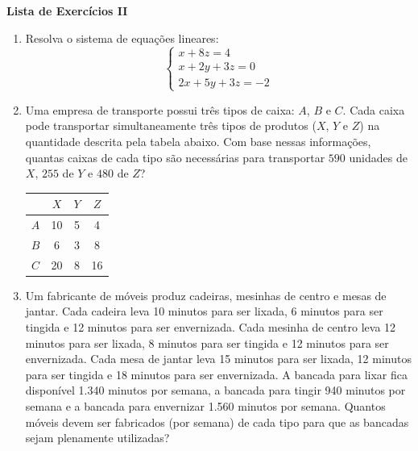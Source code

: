 \documentclass[12pt,a4paper]{article}
\begin{document}
\begin{center}
  \textbf{Lista de Exercícios II}
\end{center}

\begin{enumerate}
  \item Resolva o sistema de equações lineares:
    $$\begin{cases}
      x +  8 z  =  4\\
      x  +  2y  +  3z  =  0\\
      2x  +  5y  +  3z  =  -2
    \end{cases}$$

  \item Uma empresa de transporte possui três tipos de caixa: $A$, $B$ e
    $C$. Cada caixa pode transportar simultaneamente três tipos de produtos
    ($X$, $Y$ e $Z$) na quantidade descrita pela tabela abaixo. Com
    base nessas informações, quantas caixas de cada tipo são necessárias
    para transportar $590$ unidades de $X$, $255$ de $Y$ e $480$
    de $Z$?
    
    \begin{table}[H]
      \centering
      \begin{tabular}{|c|c|c|c|}
        \cline{2-4} 
        \multicolumn{1}{c|}{} & $X$ & $Y$ & $Z$\\
        \hline 
        $A$ & 10 & 5 & 4\\
        \hline 
        $B$ & 6 & 3 & 8\\
        \hline 
        $C$ & 20 & 8 & 16\\
        \hline 
      \end{tabular}
    \end{table}

  \item Um fabricante de móveis produz cadeiras, mesinhas de centro e mesas
    de jantar. Cada cadeira leva 10 minutos para ser lixada, 6 minutos
    para ser tingida e 12 minutos para ser envernizada. Cada mesinha de
    centro leva 12 minutos para ser lixada, 8 minutos para ser tingida
    e 12 minutos para ser envernizada. Cada mesa de jantar leva 15 minutos
    para ser lixada, 12 minutos para ser tingida e 18 minutos para ser
    envernizada. A bancada para lixar fica disponível 1.340 minutos por
    semana, a bancada para tingir 940 minutos por semana e a bancada para
    envernizar 1.560 minutos por semana. Quantos móveis devem ser fabricados
    (por semana) de cada tipo para que as bancadas sejam plenamente utilizadas?


\end{enumerate}
\end{document}
